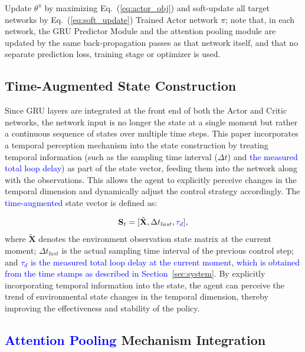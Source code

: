 \documentclass[review]{elsarticle}
\begin{document}
\begin{algorithm}[htbp]
\begin{algorithmic}[1]
        \State Update $\theta^{\pi}$ by maximizing Eq.~(\ref{eq:actor_obj}) and soft-update all target networks by Eq.~(\ref{eq:soft_update})
     \EndIf
  \EndFor
\EndFor
\Ensure Trained Actor network $\pi$; note that, in each network, the GRU Predictor Module and the attention pooling module are updated by the same back-propagation passes as that network itself, and that no separate prediction loss, training stage or optimizer is used.
\end{algorithmic}
\end{algorithm}

\subsection{Time-Augmented State Construction}

Since GRU layers are integrated at the front end of both the Actor and Critic networks, the network input is no longer the state at a single moment but rather a continuous sequence of states over multiple time steps.
This paper incorporates a temporal perception mechanism into the state construction by treating temporal information (such as the sampling time interval ($\Delta t$) and \textcolor{blue}{the measured total loop delay}) as part of the state vector, feeding them into the network along with the observations.
This allows the agent to explicitly perceive changes in the temporal dimension and dynamically adjust the control strategy accordingly.
The \textcolor{blue}{time-augmented} state vector is defined as:

\begin{equation}\label{eq:time_augmented_state}
{\mathbf{S}}_{t}=[\tilde{\mathbf{X}},\Delta {t}_{last},\textcolor{blue}{{\tau}_{d}}],
\end{equation}
where $\tilde{\mathbf{X}}$ denotes the environment observation state matrix at the current moment; $\Delta t_{last}$ is the actual sampling time interval of the previous control step; and \textcolor{blue}{$\tau_{d}$ is the measured total loop delay at the current moment, which is obtained from the time stamps as described in Section~\ref{sec:system}}.
By explicitly incorporating temporal information into the state, the agent can perceive the trend of environmental state changes in the temporal dimension, thereby improving the effectiveness and stability of the policy.

\subsection{\textcolor{blue}{Attention Pooling} Mechanism Integration}
\label{subsec:attention}
\end{document}
